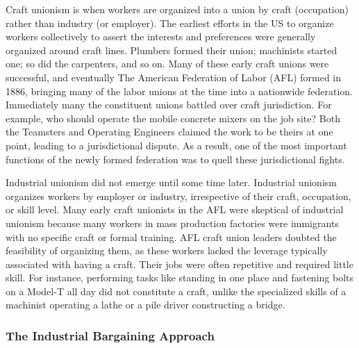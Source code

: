 \documentclass[12pt]{article}
\begin{document}
Craft unionism is when workers are organized into a union by craft (occupation) rather than industry (or employer). The earliest efforts in the US to organize workers collectively to assert the interests and preferences were generally organized around craft lines. Plumbers formed their union; machinists started one; so did the carpenters, and so on. Many of these early craft unions were successful, and eventually The American Federation of Labor (AFL) formed in 1886, bringing many of the labor unions at the time into a nationwide federation. Immediately many the constituent unions battled over craft jurisdiction. For example, who should operate the mobile concrete mixers on the job site? Both the Teamsters and Operating Engineers claimed the work to be theirs at one point, leading to a jurisdictional dispute. As a result, one of the most important functions of the newly formed federation was to quell these jurisdictional fights.


Industrial unionism did not emerge until some time later. Industrial unionism organizes workers by employer or industry, irrespective of their craft, occupation, or skill level. Many early craft unionists in the AFL were skeptical of industrial unionism because many workers in mass production factories were immigrants with no specific craft or formal training. AFL craft union leaders doubted the feasibility of organizing them, as these workers lacked the leverage typically associated with having a craft. Their jobs were often repetitive and required little skill. For instance, performing tasks like standing in one place and fastening bolts on a Model-T all day did not constitute a craft, unlike the specialized skills of a machinist operating a lathe or a pile driver constructing a bridge.

\subsubsection{The Industrial Bargaining Approach}
\end{document}
